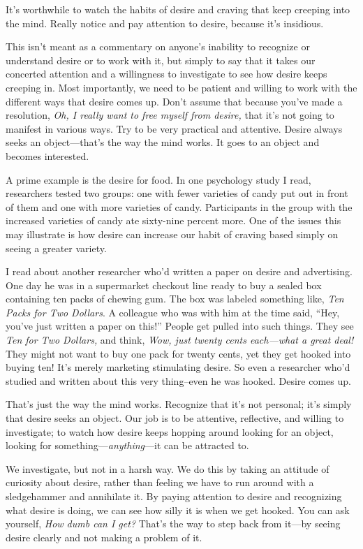 
It's worthwhile to watch the habits of desire and craving that keep 
creeping into the mind. Really notice and pay attention to desire, 
because it's insidious.

This isn't meant as a commentary on anyone's inability to recognize or 
understand desire or to work with it, but simply to say that it takes 
our concerted attention and a willingness to investigate to see how 
desire keeps creeping in. Most importantly, we need to be patient and 
willing to work with the different ways that desire comes up. Don't 
assume that because you've made a resolution, \emph{Oh, I really want 
to free myself from desire,} that it's not going to manifest in various 
ways. Try to be very practical and attentive. Desire always seeks an 
object---that's the way the mind works. It goes to an object and 
becomes interested.

A prime example is the desire for food. In one psychology study I read, 
researchers tested two groups: one with fewer varieties of candy put 
out in front of them and one with more varieties of candy. Participants 
in the group with the increased varieties of candy ate sixty-nine 
percent more. One of the issues this may illustrate is how desire can 
increase our habit of craving based simply on seeing a greater variety.

I read about another researcher who'd written a paper on desire and 
advertising. One day he was in a supermarket checkout line ready to buy 
a sealed box containing ten packs of chewing gum. The box was labeled 
something like, \emph{Ten Packs for Two Dollars}. A colleague who was 
with him at the time said, ``Hey, you've just written a paper on 
this!'' People get pulled into such things. They see \emph{Ten for Two 
Dollars,} and think, \emph{Wow, just twenty cents each---what a great 
deal!} They might not want to buy one pack for twenty cents, yet they 
get hooked into buying ten! It's merely marketing stimulating desire. 
So even a researcher who'd studied and written about this very 
thing–even he was hooked. Desire comes up.

That's just the way the mind works. Recognize that it's not personal; 
it's simply that desire seeks an object. Our job is to be attentive, 
reflective, and willing to investigate; to watch how desire keeps 
hopping around looking for an object, looking for 
something---\emph{anything}---it can be attracted to.

We investigate, but not in a harsh way. We do this by taking an 
attitude of curiosity about desire, rather than feeling we have to run 
around with a sledgehammer and annihilate it. By paying attention to 
desire and recognizing what desire is doing, we can see how silly it is 
when we get hooked. You can ask yourself, \emph{How dumb can I get?} 
That's the way to step back from it---by seeing desire clearly and not 
making a problem of it.


